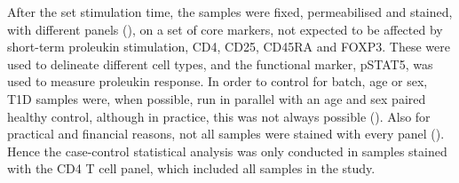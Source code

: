 After the set stimulation time, the samples were fixed, permeabilised and stained, with different panels (), 
on a set of core markers, not expected to be affected by short-term proleukin stimulation,
CD4, CD25, CD45RA and FOXP3.
These were used to delineate different cell types, and the functional marker, pSTAT5,
was used to measure proleukin response.
In order to control for batch, age or sex, \gls{T1D} samples were, when possible, run in parallel with an age and sex paired healthy control, although in practice, this was not always possible ().
Also for practical and financial reasons, not all samples were stained with every panel ().
Hence the case-control statistical analysis was only conducted in samples stained with the CD4 T cell panel, which included all samples in the study.



